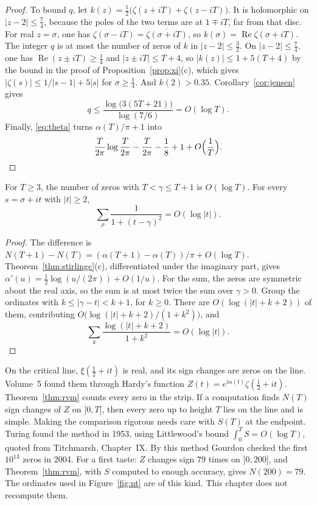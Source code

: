 \begin{proof}
To bound $q$, let $k(z)=\frac12\bigl(\zeta(z+iT)+\zeta(z-iT)\bigr)$. It is holomorphic on $|z-2|\le\frac74$, because the poles of the two terms are at $1\mp iT$, far from that disc. For real $z=\sigma$, one has $\zeta(\sigma-iT)=\overline{\zeta(\sigma+iT)}$, so $k(\sigma)=\operatorname{Re}\zeta(\sigma+iT)$. The integer $q$ is at most the number of zeros of $k$ in $|z-2|\le\frac32$. On $|z-2|\le\frac74$, one has $\operatorname{Re}(z\pm iT)\ge\frac14$ and $|z\pm iT|\le T+4$, so $|k(z)|\le1+5(T+4)$ by the bound in the proof of Proposition~\ref{prop:xi}(c), which gives $|\zeta(s)|\le1/|s-1|+5|s|$ for $\sigma\ge\frac14$. And $k(2)>0.35$. Corollary~\ref{cor:jensen} gives
\[
q\le\frac{\log\bigl(3(5T+21)\bigr)}{\log(7/6)}=O(\log T).
\]
Finally, \eqref{eq:theta} turns $\alpha(T)/\pi+1$ into
\[
\frac T{2\pi}\log\frac T{2\pi}-\frac T{2\pi}-\frac18+1+O\Bigl(\frac1T\Bigr).
\]
\end{proof}

\begin{corollary}\label{cor:nunit}
For $T\ge3$, the number of zeros with $T<\gamma\le T+1$ is $O(\log T)$. For every $s=\sigma+it$ with $|t|\ge2$,
\[
\sum_\rho\frac1{1+(t-\gamma)^2}=O(\log|t|).
\]
\end{corollary}
\begin{proof}
The difference is $N(T+1)-N(T)=(\alpha(T+1)-\alpha(T))/\pi+O(\log T)$. Theorem~\ref{thm:stirlingc}(c), differentiated under the imaginary part, gives $\alpha'(u)=\frac12\log(u/(2\pi))+O(1/u)$. For the sum, the zeros are symmetric about the real axis, so the sum is at most twice the sum over $\gamma>0$. Group the ordinates with $k\le|\gamma-t|<k+1$, for $k\ge0$. There are $O(\log(|t|+k+2))$ of them, contributing $O\bigl(\log(|t|+k+2)/(1+k^2)\bigr)$, and
\[
\sum_k\frac{\log(|t|+k+2)}{1+k^2}=O(\log|t|).
\]
\end{proof}

\begin{remark}
On the critical line, $\xi(\frac12+it)$ is real, and its sign changes are zeros on the line. Volume~5 found them through Hardy's function $Z(t)=e^{i\alpha(t)}\zeta(\frac12+it)$. Theorem~\ref{thm:rvm} counts every zero in the strip. If a computation finds $N(T)$ sign changes of $Z$ on $]0,T]$, then every zero up to height $T$ lies on the line and is simple. Making the comparison rigorous needs care with $S(T)$ at the endpoint. Turing found the method in 1953, using Littlewood's bound $\int_0^TS=O(\log T)$, quoted from Titchmarsh, Chapter~IX. By this method Gourdon checked the first $10^{13}$ zeros in 2004. For a first taste: $Z$ changes sign $79$ times on $]0,200]$, and Theorem~\ref{thm:rvm}, with $S$ computed to enough accuracy, gives $N(200)=79$. The ordinates used in Figure~\ref{fig:nt} are of this kind. This chapter does not recompute them.
\end{remark}

